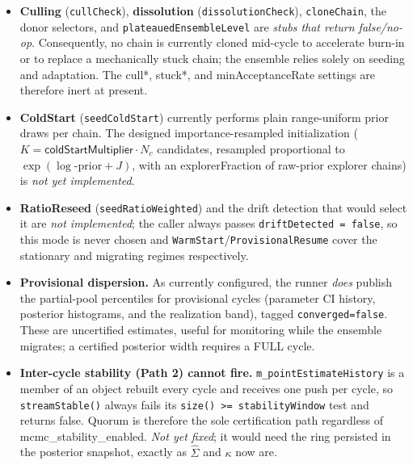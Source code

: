 \documentclass[11pt]{article}
\newcommand{\code}[1]{\texttt{\small #1}}
\newcommand{\param}[1]{\textsf{#1}}
\newcommand{\stub}[1]{{\color{stubgray}\textit{#1}}}
\begin{document}
\begin{itemize}[leftmargin=1.4em]
  \item \textbf{Culling} (\code{cullCheck}), \textbf{dissolution}
  (\code{dissolutionCheck}), \code{cloneChain}, the donor selectors, and
  \code{plateauedEnsembleLevel} are \stub{stubs that return
  false/no-op}. Consequently, no chain is currently cloned mid-cycle to
  accelerate burn-in or to replace a mechanically stuck chain; the
  ensemble relies solely on seeding and adaptation. The \param{cull*},
  \param{stuck*}, and \param{minAcceptanceRate} settings are therefore
  inert at present.
  \item \textbf{ColdStart} (\code{seedColdStart}) currently performs plain
  range-uniform prior draws per chain. The designed importance-resampled
  initialization ($K=\param{coldStartMultiplier}\cdot N_c$ candidates,
  resampled proportional to $\exp(\log\text{-prior}+J)$, with an
  \param{explorerFraction} of raw-prior explorer chains) is \stub{not yet
  implemented}.
  \item \textbf{RatioReseed} (\code{seedRatioWeighted}) and the drift
  detection that would select it are \stub{not implemented}; the caller
  always passes \code{driftDetected = false}, so this mode is never chosen
  and \code{WarmStart}/\code{ProvisionalResume} cover the stationary and
  migrating regimes respectively.
  \item \textbf{Provisional dispersion.} As currently configured, the
  runner \emph{does} publish the partial-pool percentiles for provisional
  cycles (parameter CI history, posterior histograms, and the realization
  band), tagged \code{converged=false}. These are uncertified estimates,
  useful for monitoring while the ensemble migrates; a certified posterior
  width requires a FULL cycle.
  \item \textbf{Inter-cycle stability (Path 2) cannot fire.}
  \code{m\_pointEstimateHistory} is a member of an object rebuilt every
  cycle and receives one push per cycle, so \code{streamStable()} always
  fails its \code{size() >= stabilityWindow} test and returns false. Quorum
  is therefore the sole certification path regardless of
  \param{mcmc\_stability\_enabled}. \stub{Not yet fixed}; it would need the
  ring persisted in the posterior snapshot, exactly as $\hat\Sigma$ and
  $\kappa$ now are.
\end{itemize}
\end{document}
